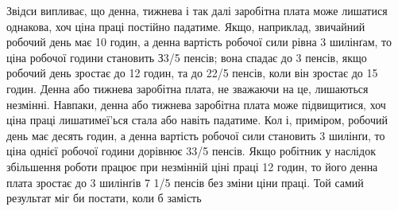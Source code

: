 Звідси випливає, що денна, тижнева і так далі заробітна плата
може лишатися однакова, хоч ціна праці постійно падатиме.
Якщо, наприклад, звичайний робочий день має 10 годин, а денна
вартість робочої сили рівна 3 шилінґам, то ціна робочої години
становить З3/5 пенсів; вона спадає до 3 пенсів, якщо робочий день
зростає до 12 годин, та до 22/5 пенсів, коли він зростає до 15 годин.
Денна або тижнева заробітна плата, не зважаючи на це,
лишаються незмінні. Навпаки, денна або тижнева заробітна
плата може підвищитися, хоч ціна праці лишатимеї'ься стала або
навіть падатиме. Кол і, приміром, робочий день має десять годин,
а денна вартість робочої сили становить 3 шилінґи, то ціна однієї
робочої години дорівнює 33/5 пенсів. Якщо робітник у наслідок
збільшення роботи працює при незмінній ціні праці 12 годин,
то його денна плата зростає до 3 шилінґів 7 1/5 пенсів без зміни
ціни праці. Той самий результат міг би постати, коли б замість
\parbreak{}  %
